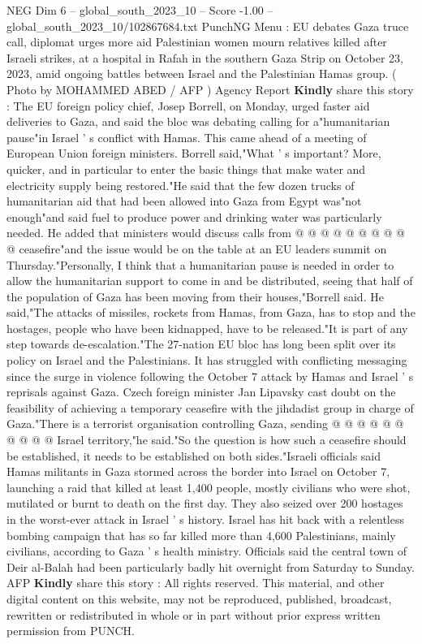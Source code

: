 \begin{textsample}{NEG Dim 6 – global\_south\_2023\_10 – Score -1.00 – global\_south\_2023\_10/102867684.txt}  \label{ex:f6_neg_215}
PunchNG Menu : EU debates Gaza truce call, diplomat urges more aid Palestinian women mourn relatives killed after Israeli strikes, at a hospital in Rafah in the southern Gaza Strip on October 23, 2023, amid ongoing battles between Israel and the Palestinian Hamas group. ( Photo by MOHAMMED ABED / AFP ) Agency Report \textbf{Kindly} share this story : The EU foreign policy chief, Josep Borrell, on Monday, urged faster aid deliveries to Gaza, and said the bloc was debating calling for a"humanitarian pause"in Israel ' s conflict with Hamas.
This came ahead of a meeting of European Union foreign ministers.
Borrell said,"What ' s important?
More, quicker, and in particular to enter the basic things that make water and electricity supply being restored."He said that the few dozen trucks of humanitarian aid that had been allowed into Gaza from Egypt was"not enough"and said fuel to produce power and drinking water was particularly needed.
He added that ministers would discuss calls from @ @ @ @ @ @ @ @ @ @ ceasefire"and the issue would be on the table at an EU leaders summit on Thursday."Personally, I think that a humanitarian pause is needed in order to allow the humanitarian support to come in and be distributed, seeing that half of the population of Gaza has been moving from their houses,"Borrell said.
He said,"The attacks of missiles, rockets from Hamas, from Gaza, has to stop and the hostages, people who have been kidnapped, have to be released."It is part of any step towards de-escalation."The 27-nation EU bloc has long been split over its policy on Israel and the Palestinians.
It has struggled with conflicting messaging since the surge in violence following the October 7 attack by Hamas and Israel ' s reprisals against Gaza.
Czech foreign minister Jan Lipavsky cast doubt on the feasibility of achieving a temporary ceasefire with the jihdadist group in charge of Gaza."There is a terrorist organisation controlling Gaza, sending @ @ @ @ @ @ @ @ @ @ Israel territory,"he said."So the question is how such a ceasefire should be established, it needs to be established on both sides."Israeli officials said Hamas militants in Gaza stormed across the border into Israel on October 7, launching a raid that killed at least 1,400 people, mostly civilians who were shot, mutilated or burnt to death on the first day.
They also seized over 200 hostages in the worst-ever attack in Israel ' s history.
Israel has hit back with a relentless bombing campaign that has so far killed more than 4,600 Palestinians, mainly civilians, according to Gaza ' s health ministry.
Officials said the central town of Deir al-Balah had been particularly badly hit overnight from Saturday to Sunday.
AFP \textbf{Kindly} share this story : All rights reserved.
This material, and other digital content on this website, may not be reproduced, published, broadcast, rewritten or redistributed in whole or in part without prior express written permission from PUNCH.

\end{textsample}
